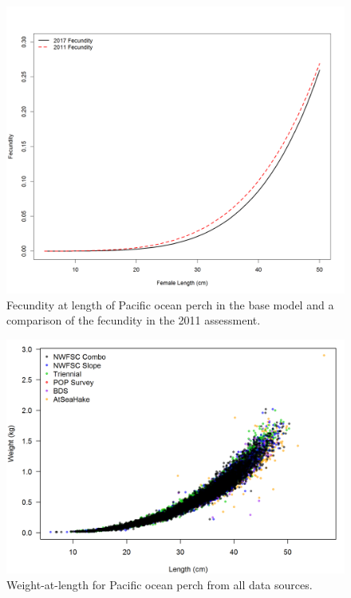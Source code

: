\documentclass[12pt,]{article}
\begin{document}
\begin{figure}
\centering
\includegraphics{Figures/Fecundity_Comparison.png}
\caption{Fecundity at length of Pacific ocean perch in the base model
and a comparison of the fecundity in the 2011 assessment.
\label{fig:fecundity}}
\end{figure}

\FloatBarrier 

\begin{figure}
\centering
\includegraphics{Figures/weightAtLengthBySource.png}
\caption{Weight-at-length for Pacific ocean perch from all data sources.
\label{fig:Wt_len}}
\end{figure}
\end{document}
